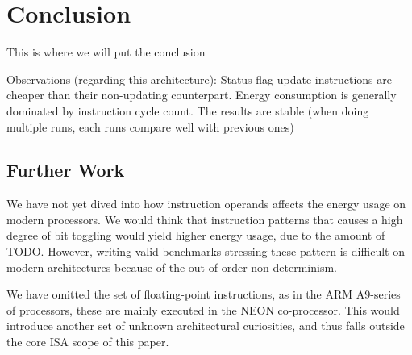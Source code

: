 \section{Conclusion}
This is where we will put the conclusion

Observations (regarding this architecture):
Status flag update instructions are cheaper than their non-updating counterpart.
Energy consumption is generally dominated by instruction cycle count.
The results are stable (when doing multiple runs, each runs compare well with
        previous ones)




\subsection{Further Work}

We have not yet dived into how instruction operands affects the energy usage on
modern processors. We would think that instruction patterns that causes a high
degree of bit toggling would yield higher energy usage, due to the amount of
TODO. However, writing valid benchmarks stressing these pattern is difficult on
modern architectures because of the out-of-order non-determinism.

We have omitted the set of floating-point instructions, as in the ARM A9-series
of processors, these are mainly executed in the NEON co-processor. This would
introduce another set of unknown architectural curiosities\cite{wolf}, and thus falls
outside the core ISA scope of this paper.
